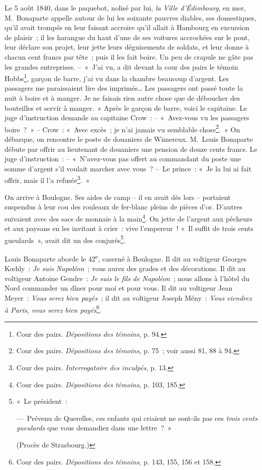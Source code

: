 \documentclass[french,twoside]{book} %
\begin{document}
Le 5 août 1840, dans le paquebot, nolisé par lui, \emph{la Ville d’Édimbourg}, en mer, M. Bonaparte appelle autour de lui les soixante pauvres diables, ses domestiques, qu’il avait trompés en leur faisant accroire qu’il allait à Hambourg en excursion de plaisir ; il les harangue du haut d’une de ses voitures accrochées sur le pont, leur déclare son projet, leur jette leurs déguisements de soldats, et leur donne à chacun cent francs par tête ; puis il les fait boire. Un peu de crapule ne gâte pas les grandes entreprises. – « J’ai vu, a dit devant la cour des pairs le témoin Hobbs\footnote{Cour des pairs. \emph{Dépositions des témoins}, p. 94.}, garçon de barre, j’ai vu dans la chambre beaucoup d’argent. Les passagers me paraissaient lire des imprimés… Les passagers ont passé toute la nuit à boire et à manger. Je ne faisais rien autre chose que de déboucher des bouteilles et servir à manger. » Après le garçon de barre, voici le capitaine. Le juge d’instruction demande au capitaine Crow : – « Avez-vous vu les passagers boire ? » – Crow : « Avec excès ; je n’ai jamais vu semblable chose\footnote{Cour des pairs. \emph{Dépositions des témoins}, p. 75 ; voir aussi 81, 88 à 94.}. » On débarque, on rencontre le poste de douaniers de Wimereux. M. Louis Bonaparte débute par offrir au lieutenant de douaniers une pension de douze cents francs. Le juge d’instruction : – « N’avez-vous pas offert au commandant du poste une somme d’argent s’il voulait marcher avec vous ? – Le prince : « Je la lui ai fait offrir, mais il l’a refusée\footnote{Cour des pairs. \emph{Interrogatoire des inculpés}, p. 13.}. »\par
On arrive à Boulogne. Ses aides de camp – il en avait dès lors – portaient suspendus à leur cou des rouleaux de fer-blanc pleins de pièces d’or. D’autres suivaient avec des sacs de monnaie à la main\footnote{Cour des pairs. \emph{Dépositions des témoins}, p. 103, 185.}. On jette de l’argent aux pêcheurs et aux paysans en les invitant à crier : vive l’empereur ! « Il suffit de trois cents gueulards », avait dit un des conjurés\footnote{ \noindent « Le président :\par
 — Prévenu de Querelles, ces enfants qui criaient ne sont-ils pas ces \emph{trois cents gueulards} que vous demandiez dans une lettre ? »\par
 (Procès de Strasbourg.)
}.\par
Louis Bonaparte aborde le 42\textsuperscript{e}, caserné à Boulogne. Il dit au voltigeur Georges Kœhly : \emph{Je suis Napoléon} ; vous aurez des grades et des décorations. Il dit au voltigeur Antoine Gendre : \emph{Je suis le fils de Napoléon} ; nous allons à l’hôtel du Nord commander un dîner pour moi et pour vous. Il dit au voltigeur Jean Meyer : \emph{Vous serez bien payés} ; il dit au voltigeur Joseph Mény : \emph{Vous viendrez à Paris, vous serez bien payés}\footnote{Cour des pairs. \emph{Dépositions des témoins}, p. 143, 155, 156 et 158.}.\par
\end{document}
